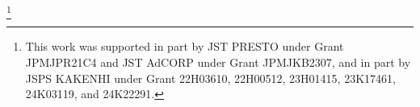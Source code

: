 \thanks{
    This work was supported in part by JST PRESTO under Grant JPMJPR21C4 and JST AdCORP under Grant JPMJKB2307, and in part by JSPS KAKENHI under Grant 22H03610, 22H00512, 23H01415, 23K17461, 24K03119, and 24K22291.
}